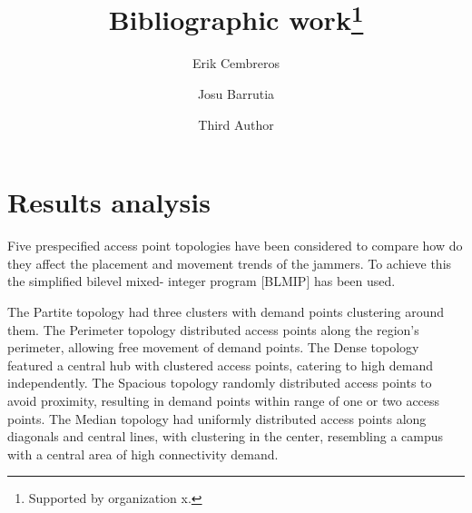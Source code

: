 \documentclass[runningheads]{llncs}
\begin{document}
	\title{Bibliographic work\thanks{Supported by organization x.}}
	\author{Erik Cembreros \and
		Josu Barrutia \and
		Third Author}
	\maketitle              %
	\begin{abstract}
			
		
	\end{abstract}
	
	\clearpage
	\section{Results analysis}
	
	Five prespecified access point topologies have been considered to compare how do they affect the placement and movement trends of the jammers. To achieve this the simplified bilevel mixed-
	integer program [BLMIP] has been used.
	
The Partite topology had three clusters with demand points clustering around them. The Perimeter topology distributed access points along the region's perimeter, allowing free movement of demand points. The Dense topology featured a central hub with clustered access points, catering to high demand independently. The Spacious topology randomly distributed access points to avoid proximity, resulting in demand points within range of one or two access points. The Median topology had uniformly distributed access points along diagonals and central lines, with clustering in the center, resembling a campus with a central area of high connectivity demand. %
	
\end{document}
